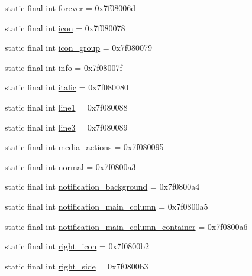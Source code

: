 \begin{DoxyCompactItemize}
\item 
static final int \mbox{\hyperlink{classandroid_1_1support_1_1v4_1_1R_1_1id_a5883771ab7e95823c127b5d3013e0dfe}{forever}} = 0x7f08006d
\item 
static final int \mbox{\hyperlink{classandroid_1_1support_1_1v4_1_1R_1_1id_a62604496896d5069c3673d6ff13b2dee}{icon}} = 0x7f080078
\item 
static final int \mbox{\hyperlink{classandroid_1_1support_1_1v4_1_1R_1_1id_a540e31dc0dde6271ea50f4f8d1b86cd5}{icon\+\_\+group}} = 0x7f080079
\item 
static final int \mbox{\hyperlink{classandroid_1_1support_1_1v4_1_1R_1_1id_af9b4f5497aef6dd0520bfb1b3d5dd026}{info}} = 0x7f08007f
\item 
static final int \mbox{\hyperlink{classandroid_1_1support_1_1v4_1_1R_1_1id_a9996d770f69100664e988763ccf14804}{italic}} = 0x7f080080
\item 
static final int \mbox{\hyperlink{classandroid_1_1support_1_1v4_1_1R_1_1id_ae38dbdf66d5cc40958bc723bfdeaea89}{line1}} = 0x7f080088
\item 
static final int \mbox{\hyperlink{classandroid_1_1support_1_1v4_1_1R_1_1id_a0bd6ed4a92b821d9a3dcac27abc038b0}{line3}} = 0x7f080089
\item 
static final int \mbox{\hyperlink{classandroid_1_1support_1_1v4_1_1R_1_1id_a5002529f1c643c3d506c47c6089bbcf5}{media\+\_\+actions}} = 0x7f080095
\item 
static final int \mbox{\hyperlink{classandroid_1_1support_1_1v4_1_1R_1_1id_a08f13192f229edf6b2cb55f11f679a8e}{normal}} = 0x7f0800a3
\item 
static final int \mbox{\hyperlink{classandroid_1_1support_1_1v4_1_1R_1_1id_aefd50ba86a9a1bed7ca654118a389ec1}{notification\+\_\+background}} = 0x7f0800a4
\item 
static final int \mbox{\hyperlink{classandroid_1_1support_1_1v4_1_1R_1_1id_ae504c70319d65564dd72127fddbeb0cf}{notification\+\_\+main\+\_\+column}} = 0x7f0800a5
\item 
static final int \mbox{\hyperlink{classandroid_1_1support_1_1v4_1_1R_1_1id_a42b01419a5d5217de6c59e071e4bf055}{notification\+\_\+main\+\_\+column\+\_\+container}} = 0x7f0800a6
\item 
static final int \mbox{\hyperlink{classandroid_1_1support_1_1v4_1_1R_1_1id_a00af98f22d1daea214d4bec44f26f5a0}{right\+\_\+icon}} = 0x7f0800b2
\item 
static final int \mbox{\hyperlink{classandroid_1_1support_1_1v4_1_1R_1_1id_a8b25f7661ddb3333d9c1c0e566ff6116}{right\+\_\+side}} = 0x7f0800b3

\end{DoxyCompactItemize}
